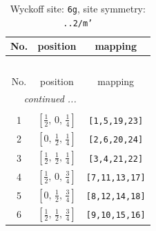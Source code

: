\documentclass[fleqn,8pt]{jsarticle}
\begin{document}
\renewcommand{\arraystretch}{1.2}
\begin{longtable}{ccc}
\caption{Wyckoff site: {\tt 6g}, site symmetry: {\tt ..2/m'}}
 \\
 \hline \hline
No. & position & mapping \\ \hline \endfirsthead

\multicolumn{2}{l}{\tablename\ \thetable{}} \\
 \hline \hline
No. & position & mapping \\ \hline \endhead

 \hline \hline
\multicolumn{2}{r}{\footnotesize\it continued ...} \\ \endfoot

 \hline \hline
\multicolumn{2}{r}{} \\ \endlastfoot

1 & $\left[ \frac{1}{2},\, 0,\, \frac{1}{4} \right]$ & {\tt [1,5,19,23]} \\ \hline
2 & $\left[ 0,\, \frac{1}{2},\, \frac{1}{4} \right]$ & {\tt [2,6,20,24]} \\ \hline
3 & $\left[ \frac{1}{2},\, \frac{1}{2},\, \frac{1}{4} \right]$ & {\tt [3,4,21,22]} \\ \hline
4 & $\left[ \frac{1}{2},\, 0,\, \frac{3}{4} \right]$ & {\tt [7,11,13,17]} \\ \hline
5 & $\left[ 0,\, \frac{1}{2},\, \frac{3}{4} \right]$ & {\tt [8,12,14,18]} \\ \hline
6 & $\left[ \frac{1}{2},\, \frac{1}{2},\, \frac{3}{4} \right]$ & {\tt [9,10,15,16]} \\
\end{longtable}
\renewcommand{\arraystretch}{1.2}
\end{document}
